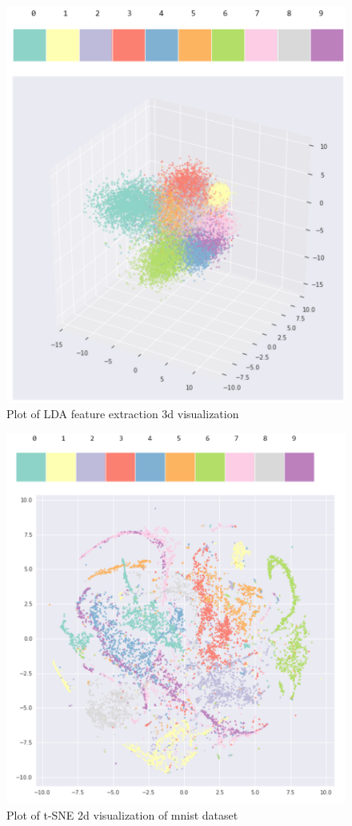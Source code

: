 \documentclass[11pt, oneside]{article}
\begin{document}
\begin{figure}[h]
\centering
\includegraphics{./pics/cov_lda_3d.PNG}
\caption{Plot of LDA feature extraction 3d visualization}
\end{figure}

\begin{figure}
\includegraphics{./pics/tsne_pca_2d.PNG}
\caption{Plot of t-SNE 2d visualization of mnist dataset}
\end{figure}
\end{document}
